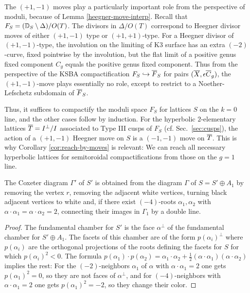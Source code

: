 \documentclass{amsart}
\begin{document}
\begin{remark} The $(+1,-1)$ moves play a particularly important
role from the perspective of moduli, because of Lemma \ref{heegner-move-interp}. 
Recall that $F_S = ({\mathbb D}_S\setminus \Delta)/O(T)$. The divisors in $\Delta/O(T)$
correspond to Heegner divisor moves of either $(+1,-1)$ type or $(+1,+1)$-type.
For a Heegner divisor of $(+1,-1)$-type, the involution on the limiting of K3 surface
has an extra $(-2)$-curve, fixed pointwise by the involution, but the
flat limit of a positive genus fixed component $C_g$ equals the 
positive genus fixed component. Thus from the perspective of the KSBA
compactification $F_S\hookrightarrow {\overline F}_S$
for pairs $({\overline X},\epsilon {\overline C}_g)$, the $(+1,-1)$-move plays
essentially no role, except to restrict to a Noether-Lefschetz subdomain of ${\overline F}_S$.

Thus, it suffices to compactify the moduli space $F_S$
for lattices $S$ on the $k=0$ line, and the other cases follow by induction. 
For the hyperbolic $2$-elementary lattices ${\overline T} = I^\perp/I$ associated to
 Type III cusps of $F_S$ (cf. Sec.~\ref{sec:cusps}),
 the action of a $(+1,-1)$ Heegner move on $S$
 is a $(-1,-1)$ move on ${\overline T}$. This is why Corollary
  \ref{cor:reach-by-moves} is relevant: We can reach all necessary
  hyperbolic lattices for semitoroidal compactifications from
  those on the $g=1$ line.
 \end{remark} 


\begin{lemma}\label{lem:heegner-diagrams}
  The Coxeter diagram $\Gamma'$ of $S'$ is
  obtained from the diagram $\Gamma$ of $S=S'\oplus A_1$ 
  by removing the vertex $r$, removing the adjacent
  white vertices, turning black adjacent vertices to white and, if
  there exist $(-4)$-roots $\alpha_1,\alpha_2$ with $\alpha\cdot \alpha_1=\alpha\cdot \alpha_2=2$, connecting
  their images in $\Gamma_1$ by a double line.
\end{lemma}
\begin{proof}
  The fundamental chamber for $S'$ is the face $\alpha^\perp$ of the
  fundamental chamber for $S'\oplus A_1$. The facets of this chamber
  are of the form $p(\alpha_i)^\perp$ where $p(\alpha_i)$ 
  are the orthogonal projections of the roots defining the facets for
  $S$ for which $p(\alpha_i)^2<0$. The formula
  $p(\alpha_1)\cdot p(\alpha_2) = \alpha_1\cdot \alpha_2  + \frac12 (\alpha\cdot \alpha_1) (\alpha\cdot \alpha_2)$
  implies the rest: For the $(-2)$-neighbors $\alpha_1$ of $\alpha$ with $\alpha\cdot \alpha_1=2$
  one gets $p(\alpha_1)^2=0$, so they are not faces of $\alpha^\perp$, and for
  $(-4)$-neighbors with $\alpha\cdot \alpha_1=2$ one gets $p(\alpha_1)^2=-2$, so they change 
  their color.
\end{proof}
\end{document}
